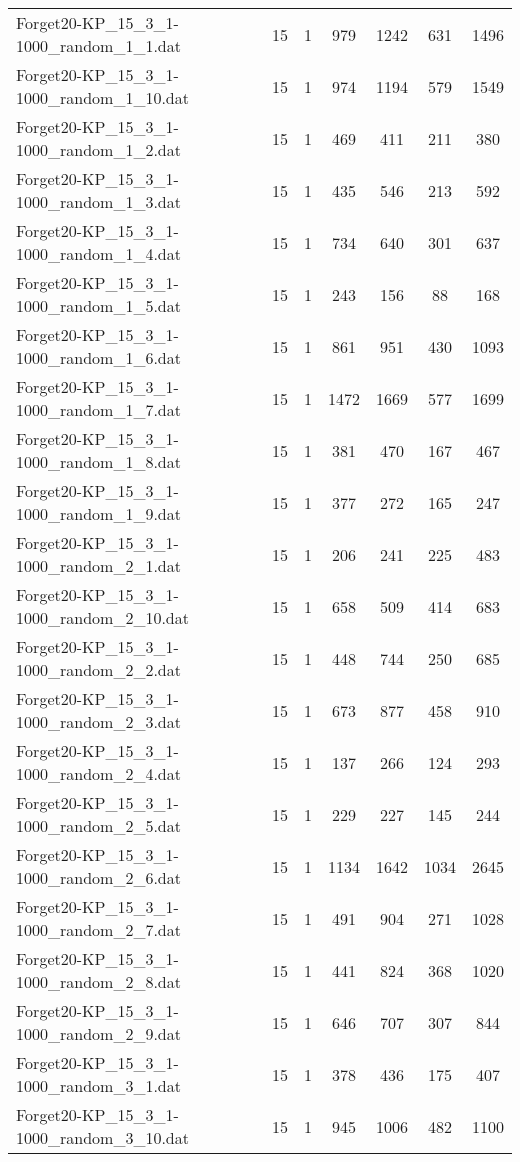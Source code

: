\begin{table}[!ht]
\begin{tabular}{lcccccc}
Forget20-KP\_15\_3\_1-1000\_random\_1\_1.dat & 15 & 1 & 979 & 1242 & 631 & 1496 \\
Forget20-KP\_15\_3\_1-1000\_random\_1\_10.dat & 15 & 1 & 974 & 1194 & 579 & 1549 \\
Forget20-KP\_15\_3\_1-1000\_random\_1\_2.dat & 15 & 1 & 469 & 411 & 211 & 380 \\
Forget20-KP\_15\_3\_1-1000\_random\_1\_3.dat & 15 & 1 & 435 & 546 & 213 & 592 \\
Forget20-KP\_15\_3\_1-1000\_random\_1\_4.dat & 15 & 1 & 734 & 640 & 301 & 637 \\
Forget20-KP\_15\_3\_1-1000\_random\_1\_5.dat & 15 & 1 & 243 & 156 & 88 & 168 \\
Forget20-KP\_15\_3\_1-1000\_random\_1\_6.dat & 15 & 1 & 861 & 951 & 430 & 1093 \\
Forget20-KP\_15\_3\_1-1000\_random\_1\_7.dat & 15 & 1 & 1472 & 1669 & 577 & 1699 \\
Forget20-KP\_15\_3\_1-1000\_random\_1\_8.dat & 15 & 1 & 381 & 470 & 167 & 467 \\
Forget20-KP\_15\_3\_1-1000\_random\_1\_9.dat & 15 & 1 & 377 & 272 & 165 & 247 \\
Forget20-KP\_15\_3\_1-1000\_random\_2\_1.dat & 15 & 1 & 206 & 241 & 225 & 483 \\
Forget20-KP\_15\_3\_1-1000\_random\_2\_10.dat & 15 & 1 & 658 & 509 & 414 & 683 \\
Forget20-KP\_15\_3\_1-1000\_random\_2\_2.dat & 15 & 1 & 448 & 744 & 250 & 685 \\
Forget20-KP\_15\_3\_1-1000\_random\_2\_3.dat & 15 & 1 & 673 & 877 & 458 & 910 \\
Forget20-KP\_15\_3\_1-1000\_random\_2\_4.dat & 15 & 1 & 137 & 266 & 124 & 293 \\
Forget20-KP\_15\_3\_1-1000\_random\_2\_5.dat & 15 & 1 & 229 & 227 & 145 & 244 \\
Forget20-KP\_15\_3\_1-1000\_random\_2\_6.dat & 15 & 1 & 1134 & 1642 & 1034 & 2645 \\
Forget20-KP\_15\_3\_1-1000\_random\_2\_7.dat & 15 & 1 & 491 & 904 & 271 & 1028 \\
Forget20-KP\_15\_3\_1-1000\_random\_2\_8.dat & 15 & 1 & 441 & 824 & 368 & 1020 \\
Forget20-KP\_15\_3\_1-1000\_random\_2\_9.dat & 15 & 1 & 646 & 707 & 307 & 844 \\
Forget20-KP\_15\_3\_1-1000\_random\_3\_1.dat & 15 & 1 & 378 & 436 & 175 & 407 \\
Forget20-KP\_15\_3\_1-1000\_random\_3\_10.dat & 15 & 1 & 945 & 1006 & 482 & 1100 \\

\end{tabular}
\end{table}
